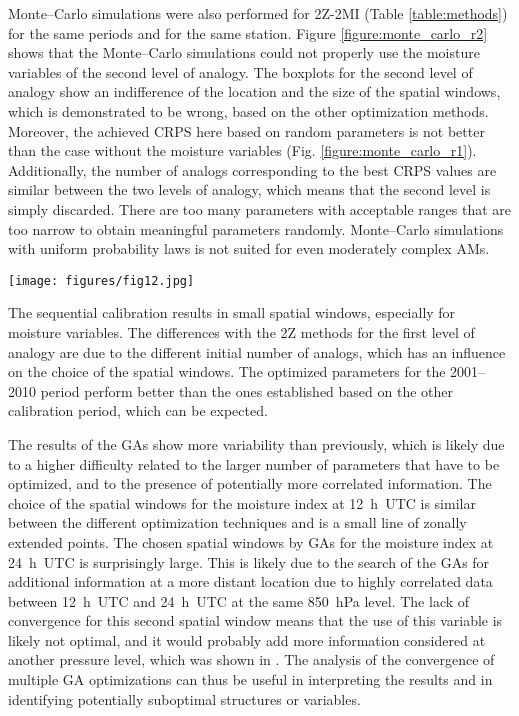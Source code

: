 \documentclass[review]{elsarticle}
\begin{document}
Monte--Carlo simulations were also performed for 2Z-2MI (Table \ref{table:methods}) for the same periods and for the same station. Figure \ref{figure:monte_carlo_r2} shows that the Monte--Carlo simulations could not properly use the moisture variables of the second level of analogy. The boxplots for the second level of analogy show an indifference of the location and the size of the spatial windows, which is demonstrated to be wrong, based on the other optimization methods. Moreover, the achieved CRPS here based on random parameters is not better than the case without the moisture variables (Fig. \ref{figure:monte_carlo_r1}). Additionally, the number of analogs corresponding to the best CRPS values are similar between the two levels of analogy, which means that the second level is simply discarded. There are too many parameters with acceptable ranges that are too narrow to obtain meaningful parameters randomly. Monte--Carlo simulations with uniform probability laws is not suited for even moderately complex AMs. 

\begin{figure*}[hbt!]
	\texttt{[image: figures/fig12.jpg]}
	\caption{Same as Fig. \ref{figure:monte_carlo_r1} but for 2Z-2MI (Table \ref{table:methods}). Results are shown for both levels of analogy (geopotential height and moisture index).}
	\label{figure:monte_carlo_r2}
\end{figure*}
\clearpage

The sequential calibration results in small spatial windows, especially for moisture variables. The differences with the 2Z methods for the first level of analogy are due to the different initial number of analogs, which has an influence on the choice of the spatial windows. The optimized parameters for the 2001--2010 period perform better than the ones established based on the other calibration period, which can be expected.

The results of the GAs show more variability than previously, which is likely due to a higher difficulty related to the larger number of parameters that have to be optimized, and to the presence of potentially more correlated information. The choice of the spatial windows for the moisture index at 12~h~UTC is similar between the different optimization techniques and is a small line of zonally extended points. The chosen spatial windows by GAs for the moisture index at 24~h~UTC is surprisingly large. This is likely due to the search of the GAs for additional information at a more distant location due to highly correlated data between 12~h~UTC and 24~h~UTC at the same 850~hPa level. The lack of convergence for this second spatial window means that the use of this variable is likely not optimal, and it would probably add more information considered at another pressure level, which was shown in \citet{Horton2018a}. The analysis of the convergence of multiple GA optimizations can thus be useful in interpreting the results and in identifying potentially suboptimal structures or variables.
\end{document}
